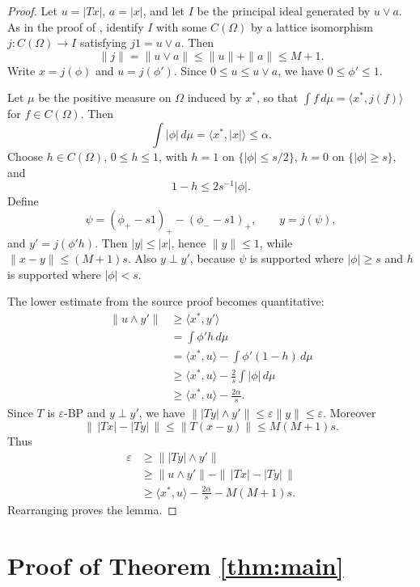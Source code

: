 \documentclass[11pt]{article}
\newcommand{\eps}{\varepsilon}
\begin{document}
\begin{proof}
Let \(u=|Tx|\), \(a=|x|\), and let \(I\) be the principal ideal generated by
\(u\vee a\). As in the proof of \cite[Theorem 2.10]{OT}, identify \(I\) with
some \(C(\Omega)\) by a lattice isomorphism \(j:C(\Omega)\to I\) satisfying
\(j1=u\vee a\). Then
\[
 \|j\|=\|u\vee a\|\le \|u\|+\|a\|\le M+1.
\]
Write \(x=j(\phi)\) and \(u=j(\phi')\). Since \(0\le u\le u\vee a\), we have
\(0\le \phi'\le1\).

Let \(\mu\) be the positive measure on \(\Omega\) induced by \(x^*\), so that
\(\int f\,d\mu=\langle x^*,j(f)\rangle\) for \(f\in C(\Omega)\). Then
\[
 \int |\phi|\,d\mu=\langle x^*,|x|\rangle\le\alpha.
\]
Choose \(h\in C(\Omega)\), \(0\le h\le1\), with \(h=1\) on
\(\{|\phi|\le s/2\}\), \(h=0\) on \(\{|\phi|\ge s\}\), and
\[
 1-h\le 2s^{-1}|\phi|.
\]
Define
\[
 \psi=(\phi_+-s1)_+-(\phi_- -s1)_+,\qquad y=j(\psi),
\]
and \(y'=j(\phi'h)\). Then \(|y|\le |x|\), hence \(\|y\|\le1\), while
\(\|x-y\|\le (M+1)s\). Also \(y\perp y'\), because \(\psi\) is supported
where \(|\phi|\ge s\) and \(h\) is supported where \(|\phi|<s\).

The lower estimate from the source proof becomes quantitative:
\[
\begin{aligned}
 \|u\wedge y'\|
 &\ge \langle x^*,y'\rangle                                      \\
 &= \int \phi' h\,d\mu                                             \\
 &= \langle x^*,u\rangle-\int \phi'(1-h)\,d\mu                     \\
 &\ge \langle x^*,u\rangle-\frac{2}{s}\int |\phi|\,d\mu             \\
 &\ge \langle x^*,u\rangle-\frac{2\alpha}{s}.
\end{aligned}
\]
Since \(T\) is \(\eps\)-BP and \(y\perp y'\), we have
\(\||Ty|\wedge y'\|\le\eps\|y\|\le\eps\). Moreover
\[
 \|\,|Tx|-|Ty|\,\|\le \|T(x-y)\|\le M(M+1)s.
\]
Thus
\[
\begin{aligned}
\eps
&\ge \||Ty|\wedge y'\|\\
&\ge \|u\wedge y'\|-\|\,|Tx|-|Ty|\,\|\\
&\ge \langle x^*,u\rangle-\frac{2\alpha}{s}-M(M+1)s.
\end{aligned}
\]
Rearranging proves the lemma.
\end{proof}

\section*{Proof of Theorem \ref{thm:main}}
\end{document}

